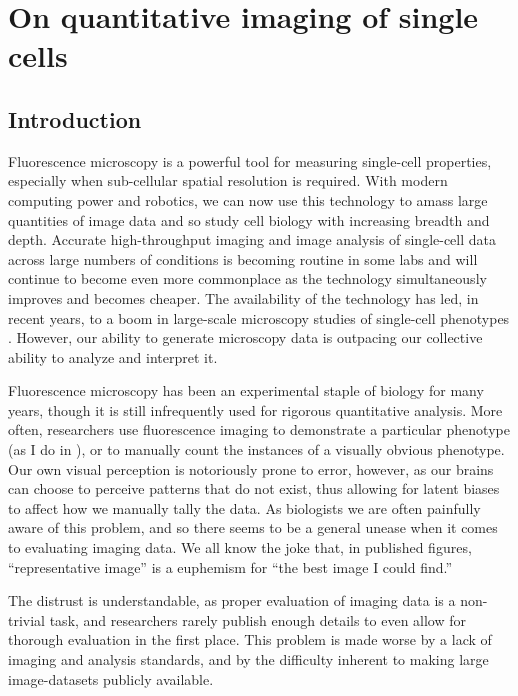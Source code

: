 \chapter{On quantitative imaging of single cells}
\label{imaging:introduction}

\section{Introduction}

Fluorescence microscopy is a
powerful tool for measuring single-cell properties, especially when sub-cellular
spatial resolution is required. With modern computing
power and robotics, we can now use this technology to amass large
quantities of image data and so study
cell biology with increasing breadth and depth. 
Accurate high-throughput imaging and image analysis of single-cell data across
large numbers of conditions is becoming routine in
some labs and will continue to become even more commonplace
as the technology simultaneously improves and becomes cheaper.
The availability of the technology has led, in recent years, to a boom
in large-scale microscopy studies of single-cell phenotypes
\cite{Neumann2006,Young2008,Feng2009,Houle2010,Held2010,Singh2010,Futamura2012}.
However, our ability to generate
microscopy data is outpacing our collective ability to
analyze and interpret it.


Fluorescence microscopy has been an experimental staple of biology for many years,
though it is still infrequently used for rigorous quantitative analysis. More often,
researchers use fluorescence imaging to demonstrate a particular phenotype
(as I do in ),
or to manually count the instances of a visually obvious
phenotype. Our own visual perception is notoriously prone to error, however,
as our brains can choose to perceive patterns that do not exist, thus
allowing for latent biases to affect how we manually tally the data.
As biologists we are often painfully aware of this problem,
and so there seems to be a general unease when it comes
to evaluating imaging data. We all know the joke that,
in published figures, ``representative image'' is a euphemism for
``the best image I could find.''


The distrust is understandable, as proper evaluation
of imaging data is a non-trivial task, and researchers
rarely publish enough details to even allow
for thorough evaluation in the first place. This problem is 
made worse by a lack of imaging and analysis standards, and by the
difficulty inherent to making large image-datasets publicly available.


